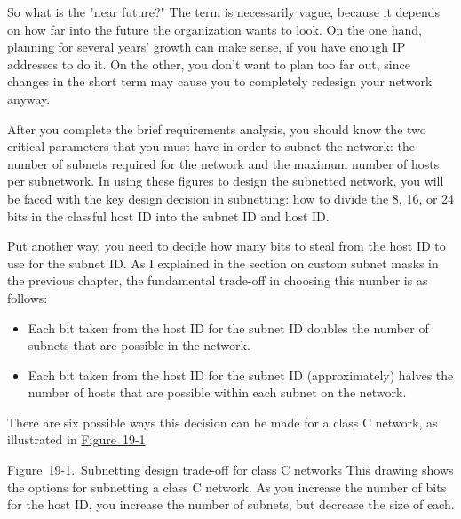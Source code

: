 \documentclass[b5paper,11pt]{memoir}
\begin{document}
So what is the "near future?" The term is necessarily vague, because it
depends on how far into the future the organization wants to look. On
the one hand, planning for several years' growth can make sense, if you
have enough IP addresses to do it. On the other, you don't want to plan
too far out, since changes in the short term may cause you to completely
redesign your network anyway.

\protect\hypertarget{ch19s02.html}{}{}

After you complete the brief requirements analysis, you should know the
two critical parameters that you must have in order to subnet the
network: the number of subnets required for the network and the maximum
number of hosts per subnetwork. In using these figures to design the
subnetted network, you will be faced with the key design decision in
subnetting: how to divide the 8, 16, or 24 bits in the classful host ID
into the subnet ID and host ID.

Put another way, you need to decide how many bits to steal from the host
ID to use for the subnet ID. As I explained in the section on custom
subnet masks in the previous chapter, the fundamental trade-off in
choosing this number is as follows:

\begin{itemize}
\item
  Each bit taken from the host ID for the subnet ID doubles the number
  of subnets that are possible in the network.
\item
  Each bit taken from the host ID for the subnet ID (approximately)
  halves the number of hosts that are possible within each subnet on the
  network.
\end{itemize}

There are six possible ways this decision can be made for a class C
network, as illustrated in
\protect\hyperlink{ch19s02.htmlux5cux23subnetting_design_trade-off_for_class_c_}{Figure~19-1}.

\protect\hypertarget{ch19s02.htmlux5cux23subnetting_design_trade-off_for_class_c_}{}{}

\protect\hypertarget{ch19s02.htmlux5cux23I_mediaobject5_d1e20630}{}{}

Figure~19-1.~Subnetting design trade-off for class C networks This
drawing shows the options for subnetting a class C network. As you
increase the number of bits for the host ID, you increase the number of
subnets, but decrease the size of each.
\end{document}
